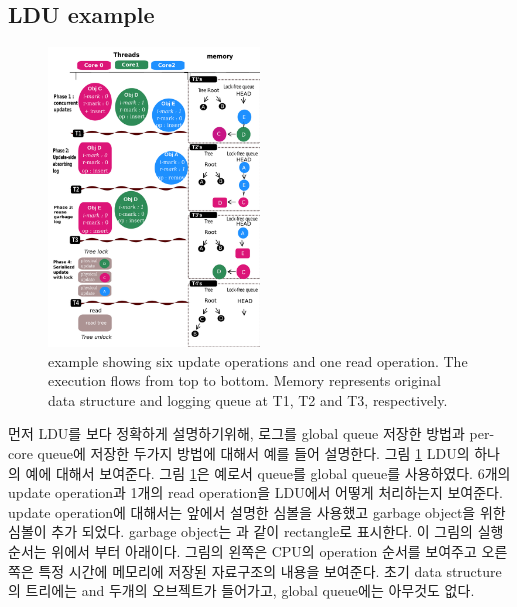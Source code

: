 \subsection{LDU example}

%

\begin{figure}[tb]
  \begin{center}
     \includegraphics[width=0.5\textwidth,height=0.5\textheight,keepaspectratio]{fig/basic_gldu}
  \end{center}
  \caption{ example showing six update operations and one read
  operation. The execution flows from top to bottom. Memory represents original
  data structure and logging queue at T1, T2 and T3, respectively.}
  \label{fig:basic}
\end{figure}


\ifkor
먼저 LDU를 보다 정확하게 설명하기위해, 로그를 global queue 저장한 방법과 per-core queue에 저장한 두가지 방법에 대해서
예를 들어 설명한다. 
그림 \ref{fig:basic} LDU의 하나의 예에 대해서 보여준다. 그림 \ref{fig:basic}은 예로서 queue를 global
queue를 사용하였다. 6개의 update operation과 1개의 read operation을 LDU에서 어떻게 처리하는지 보여준다.
update operation에 대해서는 앞에서 설명한 심볼을 사용했고 garbage object을 위한 심볼이 추가 되었다.
garbage object는 과 같이 rectangle로 표시한다. 
이 그림의 실행 순서는 위에서 부터 아래이다.
그림의 왼쪽은 CPU의 operation 순서를 보여주고 오른쪽은 특정 시간에 메모리에 저장된 자료구조의 내용을 보여준다.
초기 data structure의 트리에는  and  두개의 오브젝트가 들어가고, global
queue에는 아무것도 없다.


